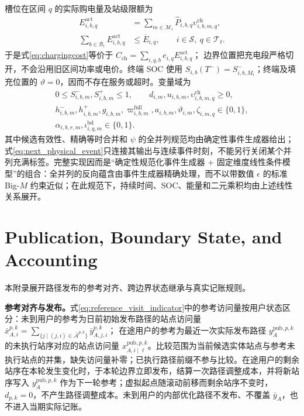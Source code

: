 \documentclass[12pt,a4paper,UTF8]{ctexart}
\begin{document}
槽位在区间 $q$ 的实际购电量及站级限额为
\begin{subequations}
\label{eq:event_interval_energy}
\begin{align}
E_{i,b,q}^{\mathrm{act}}
&=\sum_{m\in\mathcal M_i}
\widehat P_{i,b,q}
\upsilon_{i,b,m,q}^{\mathrm{ch}},\\
\sum_{b\in\mathcal B_i}E_{i,b,q}^{\mathrm{act}}
&\le\overline E_{i,q},
\qquad i\in\mathcal S,\ q\in\mathcal T_\ell.
\end{align}
\end{subequations}
于是式\eqref{eq:chargingcost}等价于
$C_{\mathrm{ch}}=\sum_{i,q,b}e_{i,q}E_{i,b,q}^{\mathrm{act}}$；
边界位置把充电段严格切开，不会沿用旧区间功率或电价。终端 SOC 使用
$S_{i,b}(T^-)=S_{i,b,\overline M_i}^{-}$；终端及填充位置的 $\vartheta=0$，因而不存在服务或超时。变量域为
\[
\begin{gathered}
0\le S_{i,b,m}^{-},S_{i,b,m}^{+}\le1,
\qquad d_{i,m},u_{i,b,m},
\upsilon_{i,b,m,q}^{\mathrm{ch}}\ge0,\\
h_{i,b,m}^{-},h_{i,b,m}^{+},g_{i,b,m},
\varpi_{i,b,m}^{\mathrm{full}},a_{i,b,m},\vartheta_{i,m},
\zeta_{i,m,q}\in\{0,1\},\\
\alpha_{i,b,r,m},\iota_{i,q,m}^{\mathrm{bd}}
\in\{0,1\}.
\end{gathered}
\]
其中候选有效性、精确等时合并和 $\psi$ 的全并列规范均由确定性事件生成器给出；式\eqref{eq:next_physical_event}只连接其输出与连续事件时刻，不能另行关闭某个并列充满标签。完整实现因而是“确定性规范化事件生成器 + 固定维度线性条件模型”的组合：全并列的反向蕴含由事件生成器精确处理，而不以带数值 $\epsilon$ 的标准 Big-$M$ 约束近似；在此规范下，持续时间、SOC、能量和二元乘积均由上述线性关系展开。



\section{Publication, Boundary State, and Accounting}
\label{app:accounting}

本附录展开路径发布的参考对齐、跨边界状态继承与真实记账规则。

\textbf{参考对齐与发布。}式\eqref{eq:reference_visit_indicator}中的参考访问量按用户状态区分：未到用户的参考为日前初始发布路径的站点访问量
$\bar x_{A,i}^{p,k}=\sum_{\{j\mid(j,i)\in\bar{\mathcal A}^{p,k}\}}\bar y_{A,j,i}^{p,k}$；
在途用户的参考为最近一次实际发布路径 $y_A^{\mathrm{pub},p,k}$ 的未执行站序对应的站点访问量 $x_{A,i\mid\ell}^{\mathrm{pub},p,k}$。比较范围为当前候选实体站点与参考未执行站点的并集，缺失访问量补零；已执行路径前缀不参与比较。在途用户的剩余站序在本轮发生变化时，于本轮边界立即发布，结算一次路径调整成本，并将新站序写入 $y_A^{\mathrm{pub},p,k}$ 作为下一轮参考；虚拟起点随滚动前移而剩余站序不变时，$d_{p,k}=0$，不产生路径调整成本。未到用户的内部优化路径不发布、不覆盖 $\bar y_A$，也不进入当期实际记账。
\end{document}
